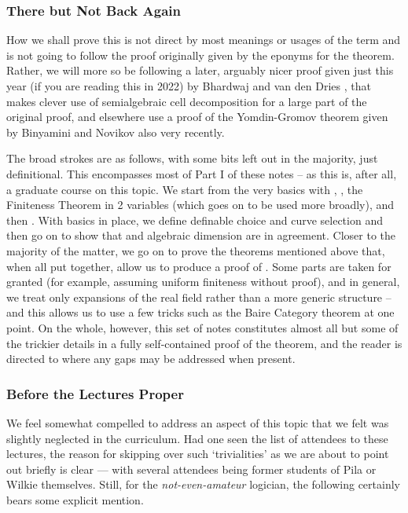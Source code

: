 \subsubsection{There but Not Back Again}

How we shall prove this is not direct by most meanings or usages of the term and is not going to follow the proof originally given by the eponyms for the theorem. Rather, we will more so be following a later, arguably nicer proof given just this year (if you are reading this in 2022) by Bhardwaj and van den Dries \cite{bhardwaj_pilawilkie_2022}, that makes clever use of semialgebraic cell decomposition for a large part of the original proof, and elsewhere use a proof of the Yomdin-Gromov theorem given by Binyamini and Novikov \cite{binyamini_yomdingromov_2021} also very recently.

The broad strokes are as follows, with some bits left out in the majority, just definitional. This encompasses most of Part I of these notes -- as this is, after all, a graduate course on this topic. We start from the very basics with , \omy, the Finiteness Theorem in 2 variables (which goes on to be used more broadly), and then \cds. With basics in place, we define definable choice and curve selection and then go on to show that  and algebraic dimension are in agreement. Closer to the majority of the matter, we go on to prove the theorems mentioned above that, when all put together, allow us to produce a proof of \pw. Some parts are taken for granted (for example, assuming uniform finiteness without proof), and in general, we treat only expansions of the real field rather than a more generic structure -- and this allows us to use a few tricks such as the Baire Category theorem at one point. On the whole, however, this set of notes constitutes almost all but some of the trickier details in a fully self-contained proof of the \pw theorem, and the reader is directed to where any gaps may be addressed when present.


\subsubsection{Before the Lectures Proper}

We feel somewhat compelled to address an aspect of this topic that we felt was slightly neglected in the curriculum. Had one seen the list of attendees to these lectures, the reason for skipping over such `trivialities' as we are about to point out briefly is clear — with several attendees being former students of Pila or Wilkie themselves. Still, for the \emph{not-even-amateur} logician, the following certainly bears some explicit mention.

